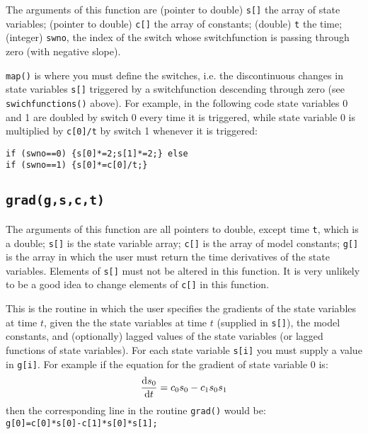 \documentclass[10pt] {article}
\newcommand{\dif}[2]{\frac{{\rm d} #1}{{\rm d} #2}}
\begin{document}
The arguments of this function are (pointer to double) \verb+s[]+ the array of state variables; %
(pointer to double) \verb+c[]+  the array of constants; (double) \verb+t+ the time; (integer) %
\verb+swno+, the index of the switch whose switchfunction is passing through zero (with negative %
slope).

\verb+map()+ is where you must define the switches, i.e. the discontinuous changes in state %
variables \verb+s[]+ triggered by a switchfunction descending through zero (see {\tt %
swichfunctions()} above). For example, in the following code state variables 0 and 1 are doubled %
by switch 0 every time it is triggered, while state variable 0 is multiplied by \verb+c[0]/t+ by %
switch 1 whenever it is triggered:
\begin{verbatim}
if (swno==0) {s[0]*=2;s[1]*=2;} else
if (swno==1) {s[0]*=c[0]/t;}
\end{verbatim} 

\subsection{\tt grad(g,s,c,t)}

The arguments of this function are all pointers to double, except time \verb+t+, which is a %
double; \verb+s[]+ is the state variable array; \verb+c[]+ is the array of model constants; %
\verb+g[]+ is the array in which the user must return the time derivatives of the state %
variables. Elements of \verb+s[]+ must not be altered in this function. It is very unlikely to be %
a good idea to change elements of \verb+c[]+ in this function.

This is the routine in which the user specifies the gradients of the state variables at time $ %
t$, given the the state variables at time $ t$ (supplied in \verb+s[]+), the model constants, and %
(optionally) lagged values of the state variables (or lagged functions of state variables). For %
each state variable \verb+s[i]+ you must supply a value in \verb+g[i]+. For example if the %
equation for the gradient of state variable 0 is:
$$
\dif{s_0}{t} = c_0 s_0 - c_1 s_0 s_1
$$
then the corresponding line in the routine \verb+grad()+ would be:\\
\verb+g[0]=c[0]*s[0]-c[1]*s[0]*s[1];+\\
\end{document}
